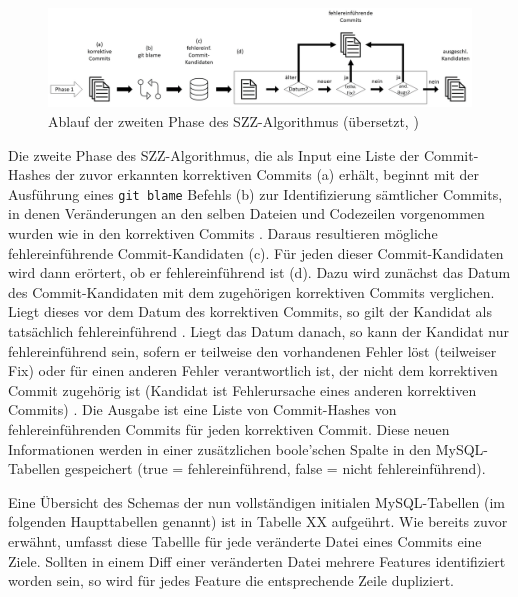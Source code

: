 \begin{figure}[]
    \centering
    \includegraphics[width=\textwidth]{images/SZZ}
    \caption{Ablauf der zweiten Phase des SZZ-Algorithmus (übersetzt, \cite{Borg2019})\label{fig:szz}}
\end{figure}

Die zweite Phase des SZZ-Algorithmus, die als Input eine Liste der Commit-Hashes der zuvor erkannten korrektiven Commits (a) erhält, beginnt mit der Ausführung eines \texttt{git blame} Befehls (b) zur Identifizierung sämtlicher Commits, in denen Veränderungen an den selben Dateien und Codezeilen vorgenommen wurden wie in den korrektiven Commits \cite{Borg2019}. Daraus resultieren mögliche fehlereinführende Commit-Kandidaten (c). Für jeden dieser Commit-Kandidaten wird dann erörtert, ob er fehlereinführend ist (d). Dazu wird zunächst das Datum des Commit-Kandidaten mit dem zugehörigen korrektiven Commits verglichen. Liegt dieses vor dem Datum des korrektiven Commits, so gilt der Kandidat als tatsächlich fehlereinführend \cite{Borg2019}. Liegt das Datum danach, so kann der Kandidat nur fehlereinführend sein, sofern er teilweise den vorhandenen Fehler löst (teilweiser Fix) oder für einen anderen Fehler verantwortlich ist, der nicht dem korrektiven Commit zugehörig ist (Kandidat ist Fehlerursache eines anderen korrektiven Commits) \cite{Borg2019}. Die Ausgabe ist eine Liste von Commit-Hashes von fehlereinführenden Commits für jeden korrektiven Commit. Diese neuen Informationen werden in einer zusätzlichen boole'schen Spalte in den MySQL-Tabellen gespeichert (true = fehlereinführend, false = nicht fehlereinführend). 

Eine Übersicht des Schemas der nun vollständigen initialen  MySQL-Tabellen (im folgenden Haupttabellen genannt) ist in Tabelle XX aufgeührt. Wie bereits zuvor erwähnt, umfasst diese Tabellle für jede veränderte Datei eines Commits eine Ziele. Sollten in einem Diff einer veränderten Datei mehrere Features identifiziert worden sein, so wird für jedes Feature die entsprechende Zeile dupliziert.

